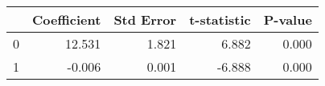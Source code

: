 \begin{tabular}{lrrrr}
\toprule
 & Coefficient & Std Error & t-statistic & P-value \\
\midrule
0 & 12.531 & 1.821 & 6.882 & 0.000 \\
1 & -0.006 & 0.001 & -6.888 & 0.000 \\
\bottomrule
\end{tabular}
